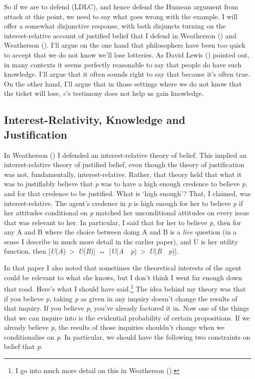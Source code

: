 \documentclass[
  11pt,
  letterpaper,
  DIV=11,
  numbers=noendperiod,
  twoside]{scrartcl}
\begin{document}
So if we are to defend (LDLC), and hence defend the Humean argument from
attack at this point, we need to say what goes wrong with the example. I
will offer a somewhat disjunctive response, with both disjuncts turning
on the interest-relative account of justified belief that I defend in
Weatherson () and Weatherson
(). I'll argue on the one hand that
philosophers have been too quick to accept that we do not know we'll
lose lotteries. As David Lewis () pointed
out, in many contexts it seems perfectly reasonable to say that people
do have such knowledge. I'll argue that it often sounds right to say
that because it's often true. On the other hand, I'll argue that in
those settings where we do not know that the ticket will lose,
\emph{c}'s testimony does not help us gain knowledge.

\subsection{Interest-Relativity, Knowledge and
Justification}\label{interest-relativity-knowledge-and-justification}

In Weatherson () I defended
an interest-relative theory of belief. This implied an interest-relative
theory of justified belief, even though the theory of justification was
not, fundamentally, interest-relative. Rather, that theory held that
what it was to justifiably believe that \emph{p} was to have a high
enough credence to believe \emph{p}, and for that credence to be
justified. What is `high enough'? That, I claimed, was
interest-relative. The agent's credence in \emph{p} is high enough for
her to believe \emph{p} if her attitudes conditional on \emph{p} matched
her unconditional attitudes on every issue that was relevant to her. In
particular, I said that for her to believe \emph{p}, then for any A and
B where the choice between doing A and B is a \emph{live} question (in a
sense I describe in much more detail in the earlier paper), and U is her
utility function, then
{[}\emph{U}(\emph{A})~\textgreater~\emph{U}(\emph{B}){]}~↔~{[}\emph{U}(\emph{A}~\textbar~\emph{p})~\textgreater~\emph{U}(\emph{B}~\textbar~\emph{p}){]}.

In that paper I also noted that sometimes the theoretical interests of
the agent could be relevant to what she knows, but I don't think I went
far enough down that road. Here's what I should have said.\footnote{I go
  into much more detail on this in Weatherson
  ().} The idea behind my theory was
that if you believe \emph{p}, taking \emph{p} as given in any inquiry
doesn't change the results of that inquiry. If you believe \emph{p},
you've already factored it in. Now one of the things that we can inquire
into is the evidential probability of certain propositions. If we
already believe \emph{p}, the results of those inquiries shouldn't
change when we conditionalise on \emph{p}. In particular, we should have
the following two constraints on belief that \emph{p}.
\end{document}
